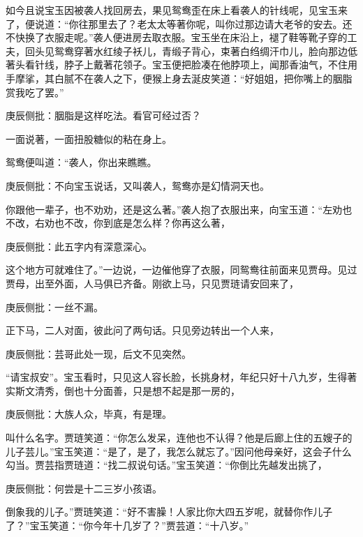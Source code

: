 \begin{parag}
    如今且说宝玉因被袭人找回房去，果见鸳鸯歪在床上看袭人的针线呢，见宝玉来了，便说道：“你往那里去了？老太太等著你呢，叫你过那边请大老爷的安去。还不快换了衣服走呢。”袭人便进房去取衣服。宝玉坐在床沿上，褪了鞋等靴子穿的工夫，回头见鸳鸯穿著水红绫子袄儿，青缎子背心，束著白绉绸汗巾儿，脸向那边低著头看针线，脖子上戴著花领子。宝玉便把脸凑在他脖项上，闻那香油气，不住用手摩挲，其白腻不在袭人之下，便猴上身去涎皮笑道：“好姐姐，把你嘴上的胭脂赏我吃了罢。”\begin{note}庚辰侧批：胭脂是这样吃法。看官可经过否？\end{note}一面说著，一面扭股糖似的粘在身上。
\end{parag}


\begin{parag}
    鸳鸯便叫道：“袭人，你出来瞧瞧。\begin{note}庚辰侧批：不向宝玉说话，又叫袭人，鸳鸯亦是幻情洞天也。\end{note}你跟他一辈子，也不劝劝，还是这么著。”袭人抱了衣服出来，向宝玉道：“左劝也不改，右劝也不改，你到底是怎么样？你再这么著，\begin{note}庚辰侧批：此五字内有深意深心。\end{note}这个地方可就难住了。”一边说，一边催他穿了衣服，同鸳鸯往前面来见贾母。见过贾母，出至外面，人马俱已齐备。刚欲上马，只见贾琏请安回来了，\begin{note}庚辰侧批：一丝不漏。\end{note}正下马，二人对面，彼此问了两句话。只见旁边转出一个人来，\begin{note}庚辰侧批：芸哥此处一现，后文不见突然。\end{note}“请宝叔安”。宝玉看时，只见这人容长脸，长挑身材，年纪只好十八九岁，生得著实斯文清秀，倒也十分面善，只是想不起是那一房的，\begin{note}庚辰侧批：大族人众，毕真，有是理。\end{note}叫什么名字。贾琏笑道：“你怎么发呆，连他也不认得？他是后廊上住的五嫂子的儿子芸儿。”宝玉笑道：“是了，是了，我怎么就忘了。”因问他母亲好，这会子什么勾当。贾芸指贾琏道：“找二叔说句话。”宝玉笑道：“你倒比先越发出挑了，\begin{note}庚辰侧批：何尝是十二三岁小孩语。\end{note}倒象我的儿子。”贾琏笑道：“好不害臊！人家比你大四五岁呢，就替你作儿子了？”宝玉笑道：“你今年十几岁了？”贾芸道：“十八岁。”
\end{parag}


